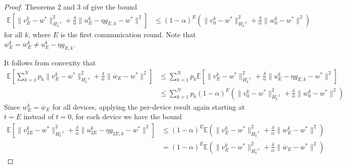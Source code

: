 \begin{proof}
		Theorems 2 and 3 of \cite{liu2018accelerating} give the bound 
		\begin{align*}
		\mathbb{E}\left[\|v_{E}^{k}-w^{\ast}\|_{H_{k}^{-1}}^{2}+\frac{\delta}{\alpha}\|u_{E}^{k}-\eta g_{E,k}-w^{\ast}\|^{2}\right] & \leq(1-\alpha)^{E}(\|v_{0}^{k}-w^{\ast}\|_{H_{k}^{-1}}^{2}+\frac{\delta}{\alpha}\|w_{0}^{k}-w^{\ast}\|^{2})
		\end{align*}
		for all $k$, where $E$ is the first communication round. Note that
		$w_{E}^{k}=\overline{w}_{E}^{k}\neq u_{E}^{k}-\eta g_{E,k}$.
		
		It follows from convexity that 
		\begin{align*}
		\mathbb{E}\left[\sum_{k=1}^{N}p_{k}\|v_{E}^{k}-w^{\ast}\|_{H_{k}^{-1}}^{2}+\frac{\delta}{\alpha}\|\overline{w}_{E}-w^{\ast}\|^{2}\right] & \leq\sum_{k=1}^{N}p_{k}\mathbb{E}\left[\|v_{E}^{k}-w^{\ast}\|_{H_{k}^{-1}}^{2}+\frac{\delta}{\alpha}\|u_{E}^{k}-\eta g_{E,k}-w^{\ast}\|^{2}\right]\\
		& \leq\sum_{k=1}^{N}p_{k}(1-\alpha)^{E}(\|v_{0}^{k}-w^{\ast}\|_{H_{k}^{-1}}^{2}+\frac{\delta}{\alpha}\|w_{0}^{k}-w^{\ast}\|^{2})
		\end{align*}
		Since $w_{E}^{k}=\overline{w}_{E}$ for all devices, applying the
		per-device result again starting at $t=E$ instead of $t=0$, for
		each device we have the bound
		\begin{align*}
		\mathbb{E}\left[\|v_{2E}^{k}-w^{\ast}\|_{H_{k}^{-1}}^{2}+\frac{\delta}{\alpha}\|u_{2E}^{k}-\eta g_{2E,k}-w^{\ast}\|^{2}\right] & \leq(1-\alpha)^{E}\mathbb{E}(\|v_{E}^{k}-w^{\ast}\|_{H_{k}^{-1}}^{2}+\frac{\delta}{\alpha}\|w_{E}^{k}-w^{\ast}\|^{2})\\
		& =(1-\alpha)^{E}\mathbb{E}(\|v_{E}^{k}-w^{\ast}\|_{H_{k}^{-1}}^{2}+\frac{\delta}{\alpha}\|\overline{w}_{E}-w^{\ast}\|^{2})
		\end{align*}
		

\end{proof}
